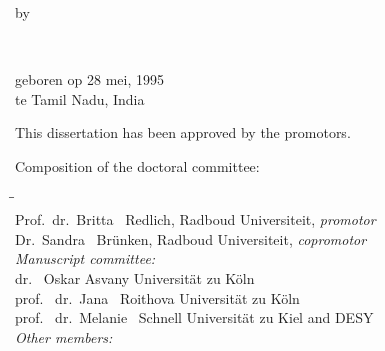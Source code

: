 \begin{titlepage}
\begin{center}
        \bigskip
        \bigskip

        by

        \bigskip
        \bigskip

        \makeatletter
        {\Large\titlefont\bfseries\@firstnames\ \MakeUppercase{\titleshape\@lastname}}
        \makeatother

        \bigskip
        \bigskip

        geboren op 28 mei, 1995\\
        te Tamil Nadu, India\\

        \vspace*{2\bigskipamount}

    \end{center}

    \clearpage
    \thispagestyle{empty}

    \noindent This dissertation has been approved by the promotors.

    \bigskip
    \noindent Composition of the doctoral committee:
    
    \begin{tabbing}
        \hspace{\tabcolsep}\=\hspace{0.33\textwidth}\=\hspace{0.66\textwidth}                   \\[-3\medskipamount]
        \> Prof.\ dr.\ Britta \ Redlich,    \> Radboud Universiteit, \textit{promotor}      \\
        \> Dr.\ Sandra \ Br\"unken,        \> Radboud Universiteit, \textit{copromotor}    \\[\medskipamount]
        \>\textit{Manuscript committee:}  \\[\smallskipamount]
        \> dr. \ Oskar Asvany            \> Universit\"at zu K\"oln \\
        \> prof. \ dr.\ Jana \ Roithova            \> Universit\"at zu K\"oln \\
        \> prof. \ dr.\ Melanie \ Schnell   \> Universit\"at zu Kiel and DESY \\[\medskipamount]
        \>\textit{Other members:} \\[\smallskipamount]
    \end{tabbing}


\end{titlepage}
